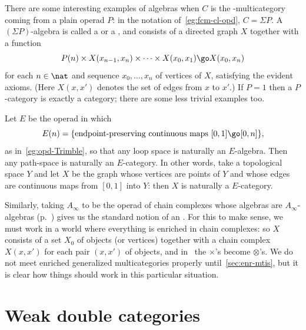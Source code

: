 There are some interesting examples of algebras when $C$ is the
\fc-multicategory coming from a plain operad $P$: in the notation
of~\ref{eg:fcm-cl-opd}, $C = \Sigma P$.  A $(\Sigma P)$-algebra is called a
%
%
%
%
or a ,%
%
%
%
%
and consists of a directed graph $X$ together with a function
%
\begin{equation}	\label{eq:P-cat-action}
P(n) \times X(x_{n-1}, x_n) \times \cdots \times X(x_0, x_1)
\go
X(x_0, x_n)
\end{equation}
%
for each $n\in\nat$ and sequence $x_0, \ldots, x_n$ of vertices of $X$,
satisfying the evident axioms.  (Here $X(x,x')$ denotes the set of edges
from $x$ to $x'$.)  If $P=1$ then a $P$-category is exactly a category;
there are some less trivial examples too.

\begin{example}	%
%
%
Let $E$ be the operad in which 
\[
E(n) =
\{
\textrm{endpoint-preserving continuous maps }
[0,1] \go [0,n]
\},
\]
as in~\ref{eg:opd-Trimble}, so that any loop space is naturally an
$E$-algebra.  Then any path-space is naturally an $E$-category.  In other
words, take a topological space $Y$ and let $X$ be the graph whose vertices
are points of $Y$ and whose edges are continuous maps from $[0,1]$ into
$Y$: then $X$ is naturally a $E$-category.  
\end{example}

\begin{example}	%
%
%
%
%
Similarly, taking $A_\infty$ to be the operad of chain complexes whose
algebras are $A_\infty$-algebras (p.~\pageref{p:A-infty-alg}) gives us the
standard notion of an .  For this to make sense,
we must work in a world where everything is enriched in chain complexes: so
$X$ consists of a set $X_0$ of objects (or vertices) together with a chain
complex $X(x,x')$ for each pair $(x,x')$ of objects, and
in~ the $\times$'s become $\otimes$'s.  We do not
meet enriched generalized multicategories properly
until~\ref{sec:enr-mtis}, but it is clear how things should work in this
particular situation.
\end{example}




\section{Weak double categories}

